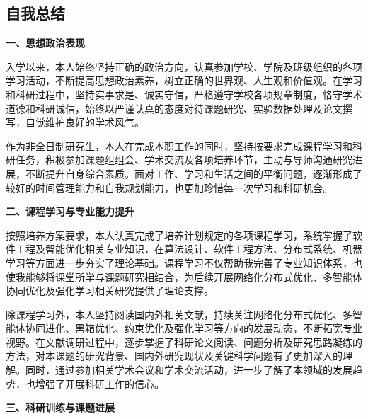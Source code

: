 
\begin{titlepage}
    \makeatletter
    \makeatother
\section{自我总结}

\noindent
\textbf{一、思想政治表现}

\par
\indent
入学以来，本人始终坚持正确的政治方向，认真参加学校、学院及班级组织的各项学习活动，不断提高思想政治素养，树立正确的世界观、人生观和价值观。在学习和科研过程中，坚持实事求是、诚实守信，严格遵守学校各项规章制度，恪守学术道德和科研诚信，始终以严谨认真的态度对待课题研究、实验数据处理及论文撰写，自觉维护良好的学术风气。

\par
\indent
作为非全日制研究生，本人在完成本职工作的同时，坚持按要求完成课程学习和科研任务，积极参加课题组组会、学术交流及各项培养环节，主动与导师沟通研究进展，不断提升自身综合素质。面对工作、学习和生活之间的平衡问题，逐渐形成了较好的时间管理能力和自我规划能力，也更加珍惜每一次学习和科研机会。

\noindent\textbf{二、课程学习与专业能力提升}

\par
\indent
按照培养方案要求，本人认真完成了培养计划规定的各项课程学习，系统掌握了软件工程及智能优化相关专业知识，在算法设计、软件工程方法、分布式系统、机器学习等方面进一步夯实了理论基础。课程学习不仅帮助我完善了专业知识体系，也使我能够将课堂所学与课题研究相结合，为后续开展网络化分布式优化、多智能体协同优化及强化学习相关研究提供了理论支撑。

\par
\indent
除课程学习外，本人坚持阅读国内外相关文献，持续关注网络化分布式优化、多智能体协同进化、黑箱优化、约束优化及强化学习等方向的发展动态，不断拓宽专业视野。在文献调研过程中，逐步掌握了科研论文阅读、问题分析及研究思路凝练的方法，对本课题的研究背景、国内外研究现状及关键科学问题有了更加深入的理解。同时，通过参加相关学术会议和学术交流活动，进一步了解了本领域的发展趋势，也增强了开展科研工作的信心。

\noindent\textbf{三、科研训练与课题进展}


\end{titlepage}
